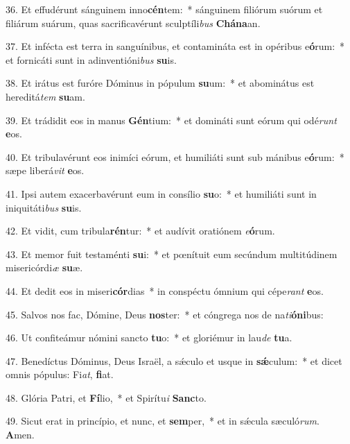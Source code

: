 36. Et effudérunt sánguinem inno\textbf{cén}tem:~*  sánguinem filiórum suórum et filiárum suárum, quas sacrificavérunt sculptíli\textit{bus} \textbf{Chá}\textbf{na}an.\

37. Et infécta est terra in sanguínibus, et contamináta est in opéribus e\textbf{ó}rum:~*  et fornicáti sunt in adinventióni\textit{bus} \textbf{su}is.\

38. Et irátus est furóre Dóminus in pópulum \textbf{su}um:~*  et abominátus est hereditá\textit{tem} \textbf{su}am.\

39. Et trádidit eos in manus \textbf{Gén}tium:~*  et domináti sunt eórum qui odé\textit{runt} \textbf{e}os.\

40. Et tribulavérunt eos inimíci eórum, et humiliáti sunt sub mánibus e\textbf{ó}rum:~*  sæpe liberá\textit{vit} \textbf{e}os.\

41. Ipsi autem exacerbavérunt eum in consílio \textbf{su}o:~*  et humiliáti sunt in iniquitáti\textit{bus} \textbf{su}is.\

42. Et vidit, cum tribula\textbf{rén}tur:~*  et audívit oratiónem \textit{e}\textbf{ó}rum.\

43. Et memor fuit testaménti \textbf{su}i:~*  et pœnítuit eum secúndum multitúdinem misericórdi\textit{æ} \textbf{su}æ.\

44. Et dedit eos in miseri\textbf{cór}dias~*  in conspéctu ómnium qui cépe\textit{rant} \textbf{e}os.\

45. Salvos nos fac, Dómine, Deus \textbf{nos}ter:~*  et cóngrega nos de na\textit{ti}\textbf{ó}\textbf{ni}bus:\

46. Ut confiteámur nómini sancto \textbf{tu}o:~*  et gloriémur in lau\textit{de} \textbf{tu}a.\

47. Benedíctus Dóminus, Deus Israël, a sǽculo et usque in \textbf{sǽ}culum:~*  et dicet omnis pópulus: Fi\textit{at}, \textbf{fi}at.\

48. Glória Patri, et \textbf{Fí}lio,~*  et Spirítu\textit{i} \textbf{Sanc}to.\

49. Sicut erat in princípio, et nunc, et \textbf{sem}per,~*  et in sǽcula sæculó\textit{rum}. \textbf{A}men.\


